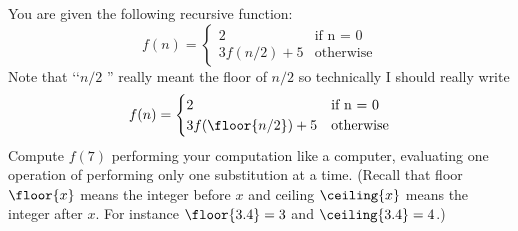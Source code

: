 You are given the following recursive function:
\[
f(n) = 
\begin{cases}
2           & \text{if n = 0} \\
3f(n/2) + 5 &\text{otherwise} 
\end{cases}
\]
Note that \lq\lq $n/2$ '' really 
meant the floor of $n/2$ so technically I should 
really write
\[
f(n) = 
\begin{cases}
  2                 & \text{if n = 0} \\
3f(\floor{n/2}) + 5 & \text{otherwise}
\end{cases}
\]
Compute $f(7)$ performing your computation like a computer,
evaluating one operation of performing only one substitution at a time.
(Recall that floor $\floor{x}$ means the integer before $x$
and ceiling $\ceiling{x}$ means the integer after $x$.
For instance $\floor{3.4} = 3$ and $\ceiling{3.4} = 4$.)
